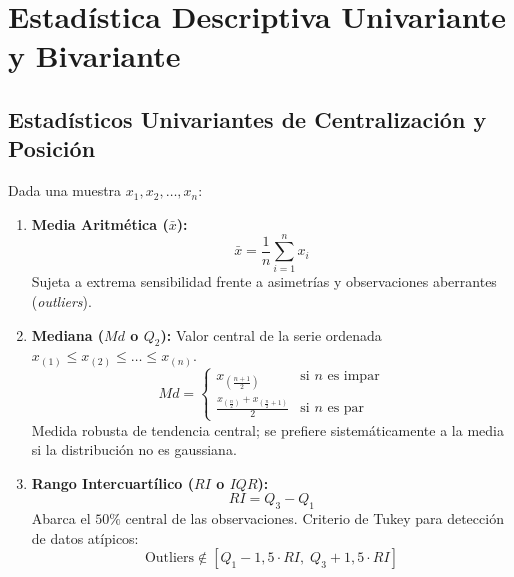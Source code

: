 \documentclass[11pt,a4paper]{report}
\theoremstyle{definition}
\begin{document}
\newpage
\chapter{Estadística Descriptiva Univariante y Bivariante}

\section{Estadísticos Univariantes de Centralización y Posición}
Dada una muestra $x_1, x_2, \dots, x_n$:
\begin{enumerate}[leftmargin=*]
    \item \textbf{Media Aritmética ($\bar{x}$):}
    \begin{equation}
    \bar{x} = \frac{1}{n} \sum_{i=1}^n x_i
    \end{equation}
    Sujeta a extrema sensibilidad frente a asimetrías y observaciones aberrantes (\emph{outliers}).
    \item \textbf{Mediana ($Md$ o $Q_2$):}
    Valor central de la serie ordenada $x_{(1)} \le x_{(2)} \le \dots \le x_{(n)}$.
    \begin{equation}
    Md = \begin{cases} 
    x_{\left(\frac{n+1}{2}\right)} & \text{si } n \text{ es impar} \\[2mm]
    \displaystyle \frac{x_{\left(\frac{n}{2}\right)} + x_{\left(\frac{n}{2} + 1\right)}}{2} & \text{si } n \text{ es par}
    \end{cases}
    \end{equation}
    Medida robusta de tendencia central; se prefiere sistemáticamente a la media si la distribución no es gaussiana.
    \item \textbf{Rango Intercuartílico ($RI$ o $IQR$):}
    \begin{equation}
    RI = Q_3 - Q_1
    \end{equation}
    Abarca el $50\%$ central de las observaciones. Criterio de Tukey para detección de datos atípicos:
    \[
    \text{Outliers} \notin [Q_1 - 1{,}5 \cdot RI, \; Q_3 + 1{,}5 \cdot RI]
    \]
\end{enumerate}
\end{document}
